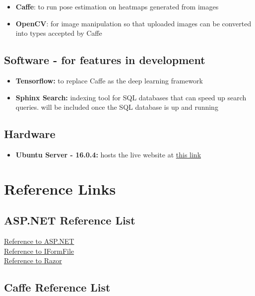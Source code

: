 \documentclass{scrreprt}
\begin{document}
\begin{itemize}
    \item \textbf{Caffe}: to run pose estimation on heatmaps generated from images
    \item \textbf{OpenCV}: for image manipulation so that uploaded images can be converted into types accepted by Caffe
\end{itemize}

\section{Software - for features in development}

\begin{itemize}
    \item \textbf{Tensorflow:} to replace Caffe as the deep learning framework
    \item \textbf{Sphinx Search:} indexing tool for SQL databases that can speed up search queries. will be included once the SQL database is up and running
\end{itemize}

\section{Hardware}

\begin{itemize}
    \item \textbf{Ubuntu Server - 16.0.4:} hosts the live website at \href{159.203.10.112}{this link}
\end{itemize}

\chapter{Reference Links}

\section{ASP.NET Reference List}

\href{https://docs.microsoft.com/en-us/aspnet/core/mvc/overview}{Reference to ASP.NET}
\\
\href{https://docs.microsoft.com/en-us/aspnet/core/api/microsoft.aspnetcore.http.iformfile}{Reference to IFormFile}
\\
\href{https://docs.microsoft.com/en-us/aspnet/core/mvc/views/razor}{Reference to Razor}

\section{Caffe Reference List}
\end{document}

